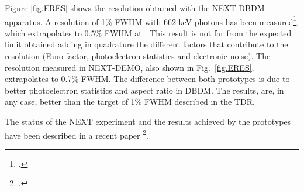Figure \ref{fig.ERES} shows the resolution obtained with the NEXT-DBDM apparatus. A resolution of 1\% FWHM with 
662 keV photons has been measured\footcite{Alvarez:2012hh}, which extrapolates to 0.5\% FWHM at \Qbb. This result is not far from the expected limit obtained adding in quadrature the different factors that contribute to the resolution (Fano factor, photoelectron statistics and electronic noise). The resolution measured in NEXT-DEMO, also shown in Fig.~\ref{fig.ERES}, extrapolates to 0.7\% FWHM. The difference between both prototypes is due to better photoelectron statistics and aspect ratio in DBDM. The results, are, in any case, better than the target of 1\% FWHM described in the TDR.

The status of the NEXT experiment and the results achieved by the prototypes have been described in a recent paper \footcite{Gomez-Cadenas:2013lta}.

